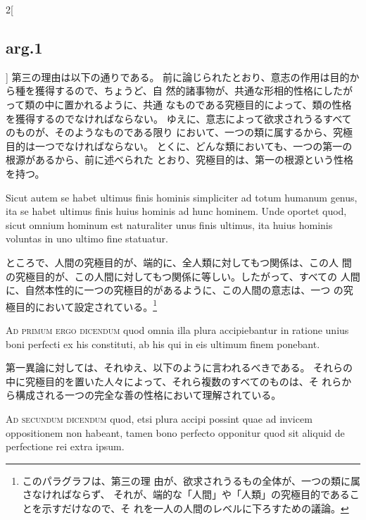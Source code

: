 \documentclass[paper=a4paper,fontsize=10pt,jafontsize=9pt,titlepage]{jlreq}
\begin{document}
\begin{paracol}{2}[\subsection{arg.1}]
第三の理由は以下の通りである。
前に論じられたとおり、意志の作用は目的から種を獲得するので、ちょうど、自
 然的諸事物が、共通な形相的性格にしたがって類の中に置かれるように、共通
 なものである究極目的によって、類の性格を獲得するのでなければならない。
ゆえに、意志によって欲求されうるすべてのものが、そのようなものである限り
 において、一つの類に属するから、究極目的は一つでなければならない。
 とくに、どんな類においても、一つの第一の根源があるから、前に述べられた
 とおり、究極目的は、第一の根源という性格を持つ。

\switchcolumn*

Sicut autem se habet ultimus finis
hominis simpliciter ad totum humanum genus, ita se habet ultimus finis
huius hominis ad hunc hominem. Unde oportet quod, sicut omnium hominum
est naturaliter unus finis ultimus, ita huius hominis voluntas in uno
ultimo fine statuatur.

\switchcolumn

ところで、人間の究極目的が、端的に、全人類に対してもつ関係は、この人
 間の究極目的が、この人間に対してもつ関係に等しい。したがって、すべての
 人間に、自然本性的に一つの究極目的があるように、この人間の意志は、一つ
 の究極目的において設定されている。\footnote{このパラグラフは、第三の理
 由が、欲求されうるもの全体が、一つの類に属さなければならず、
それが、端的な「人間」や「人類」の究極目的であることを示すだけなので、そ
 れを一人の人間のレベルに下ろすための議論。}

\switchcolumn*[\subsection{ad.1}]

{\scshape Ad primum ergo dicendum} quod omnia illa
plura accipiebantur in ratione unius boni perfecti ex his constituti, ab
his qui in eis ultimum finem ponebant.

\switchcolumn

第一異論に対しては、それゆえ、以下のように言われるべきである。
それらの中に究極目的を置いた人々によって、それら複数のすべてのものは、そ
 れらから構成される一つの完全な善の性格において理解されている。

\switchcolumn*[\subsection{ad.2}]

{\scshape Ad secundum dicendum} quod, etsi plura
accipi possint quae ad invicem oppositionem non habeant, tamen bono
perfecto opponitur quod sit aliquid de perfectione rei extra ipsum.


\end{paracol}
\end{document}

